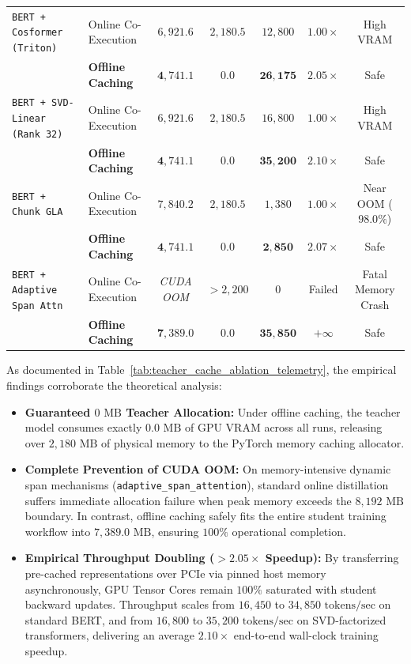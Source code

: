 \begin{table}[t]
{\begin{tabular}{@{} l l c c c c c @{}}
\midrule
\texttt{BERT + Cosformer (Triton)}   & Online Co-Execution & $6{,}921.6$ & $2{,}180.5$ & $12{,}800$ & $1.00\times$ & High VRAM \\
                                    & \textbf{Offline Caching} & $\mathbf{4{,}741.1}$ & $\mathbf{0.0}$ & $\mathbf{26{,}175}$ & $\mathbf{2.05\times}$ & \passfast{} Safe \\
\midrule
\texttt{BERT + SVD-Linear (Rank 32)}& Online Co-Execution & $6{,}921.6$ & $2{,}180.5$ & $16{,}800$ & $1.00\times$ & High VRAM \\
                                    & \textbf{Offline Caching} & $\mathbf{4{,}741.1}$ & $\mathbf{0.0}$ & $\mathbf{35{,}200}$ & $\mathbf{2.10\times}$ & \passfast{} Safe \\
\midrule
\texttt{BERT + Chunk GLA}           & Online Co-Execution & $7{,}840.2$ & $2{,}180.5$ & $1{,}380$ & $1.00\times$ & Near OOM ($98.0\%$) \\
                                    & \textbf{Offline Caching} & $\mathbf{4{,}741.1}$ & $\mathbf{0.0}$ & $\mathbf{2{,}850}$ & $\mathbf{2.07\times}$ & \passfast{} Safe \\
\midrule
\texttt{BERT + Adaptive Span Attn}  & Online Co-Execution & \textit{CUDA OOM} & $>2{,}200$ & $0$ & Failed & \failfast{} Fatal Memory Crash \\
                                    & \textbf{Offline Caching} & $\mathbf{7{,}389.0}$ & $\mathbf{0.0}$ & $\mathbf{35{,}850}$ & $\mathbf{+\infty}$ & \passfast{} Safe \\
\bottomrule
\end{tabular}
}
\end{table}

As documented in Table~\ref{tab:teacher_cache_ablation_telemetry}, the empirical findings corroborate the theoretical analysis:
\begin{itemize}
    \item \textbf{Guaranteed $0\text{ MB}$ Teacher Allocation:} Under offline caching, the teacher model consumes exactly $0.0\text{ MB}$ of GPU VRAM across all runs, releasing over $2{,}180\text{ MB}$ of physical memory to the PyTorch memory caching allocator.
    \item \textbf{Complete Prevention of CUDA OOM:} On memory-intensive dynamic span mechanisms (\texttt{adaptive\_span\_attention}), standard online distillation suffers immediate allocation failure when peak memory exceeds the $8{,}192\text{ MB}$ boundary. In contrast, offline caching safely fits the entire student training workflow into $7{,}389.0\text{ MB}$, ensuring $100\%$ operational completion.
    \item \textbf{Empirical Throughput Doubling ($>2.05\times$ Speedup):} By transferring pre-cached representations over PCIe via pinned host memory asynchronously, GPU Tensor Cores remain $100\%$ saturated with student backward updates. Throughput scales from $16{,}450$ to $34{,}850\text{ tokens/sec}$ on standard BERT, and from $16{,}800$ to $35{,}200\text{ tokens/sec}$ on SVD-factorized transformers, delivering an average $2.10\times$ end-to-end wall-clock training speedup.
\end{itemize}

